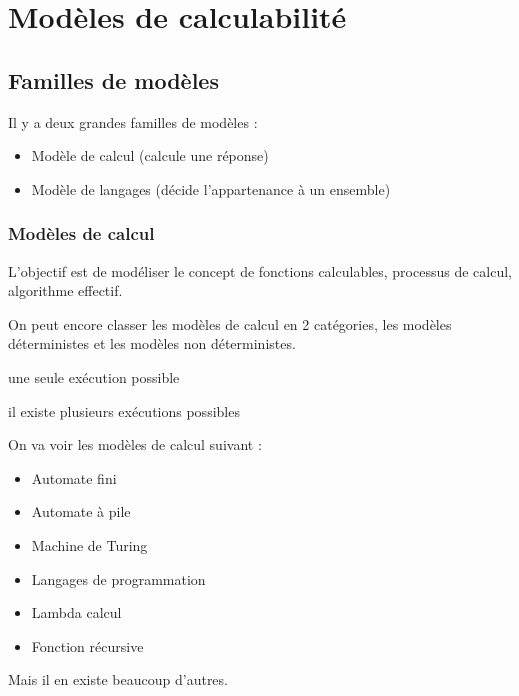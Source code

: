 
\chapter{Modèles de calculabilité}
\label{sec:mod_le_de_la_calculabilit_}

\section{Familles de modèles}
\label{sub:fammilles_de_mod_les}

Il y a deux grandes familles de modèles :
\begin{itemize}
	\item Modèle de calcul (calcule une réponse)
	\item Modèle de langages (décide l'appartenance à un ensemble)
\end{itemize}

\subsection{Modèles de calcul}
\label{ssub:mod_le_de_calcul}
L'objectif est de modéliser le concept de fonctions calculables, processus de
calcul, algorithme effectif.

On peut encore classer les modèles de calcul en 2 catégories, les
modèles déterministes et les modèles non déterministes.

\begin{mydef} une seule exécution possible
\end{mydef}

\begin{mydef} il existe plusieurs exécutions
	possibles
\end{mydef}

On va voir les modèles de calcul suivant :
\begin{itemize}
	\item Automate fini
	\item Automate à pile
	\item Machine de Turing
	\item Langages de programmation
	\item Lambda calcul
	\item Fonction récursive
\end{itemize}
Mais il en existe beaucoup d'autres.


